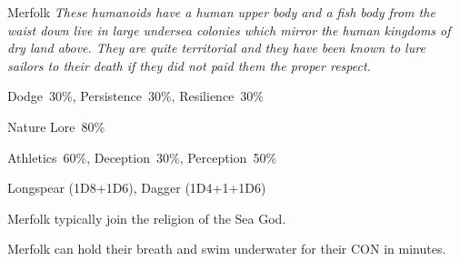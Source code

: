 \newpage

\begin{monsterbox}{Merfolk}
	\textit{These humanoids have a human upper body and a fish body from the waist down live in large undersea colonies which mirror the human kingdoms of dry land above. They are quite territorial and they have been known to lure sailors to their death if they did not paid them the proper respect.}\\
	\rpghline
	\basics[%
        hitpoints  = 14,
	majorwound = 7,
	damagemodifier = +1D6,
	powerpoints = 11,
	movementrate = {23m swimming, 7m crawling in land},
	armor = None,
	plunderrating = 1
	]
	\rpghline%
	\stats[ %
		STR = 3D6+3 (14),
		CON = 3D6   (11),
		DEX = 2D6+6 (13),
		SIZ = 3D6+6 (17),
		INT = 3D6   (11),
		POW = 3D6   (11),
		CHA = 3D6   (11)
	]
	\rpghline%
	\begin{rpg-monsteraction}[Resistances]
		Dodge~30\%, Persistence~30\%, Resilience~30\%
	\end{rpg-monsteraction}
	\begin{rpg-monsteraction}[Knowledge]
		Nature Lore~80\%
	\end{rpg-monsteraction}
	\begin{rpg-monsteraction}[Practical]
		Athletics~60\%, Deception~30\%, Perception~50\%
	\end{rpg-monsteraction}
	\begin{rpg-monsteraction}
		Longspear (1D8+1D6), Dagger (1D4+1+1D6)
	\end{rpg-monsteraction}
	\begin{rpg-monsteraction}[Magic]
		Merfolk typically join the religion of the Sea God.
	\end{rpg-monsteraction}
	\begin{rpg-monsteraction}
		Merfolk can hold their breath and swim underwater for their CON in minutes.
	\end{rpg-monsteraction}

\end{monsterbox}

\newpage

